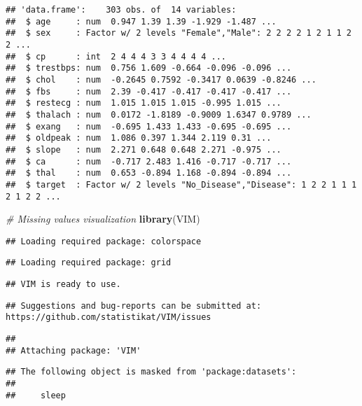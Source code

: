 \documentclass[
]{article}
\newenvironment{Shaded}{\begin{snugshade}}{\end{snugshade}}
\newcommand{\CommentTok}[1]{\textcolor[rgb]{0.56,0.35,0.01}{\textit{#1}}}
\newcommand{\FunctionTok}[1]{\textcolor[rgb]{0.13,0.29,0.53}{\textbf{#1}}}
\newcommand{\NormalTok}[1]{#1}
\begin{document}
\begin{verbatim}
## 'data.frame':    303 obs. of  14 variables:
##  $ age     : num  0.947 1.39 1.39 -1.929 -1.487 ...
##  $ sex     : Factor w/ 2 levels "Female","Male": 2 2 2 2 1 2 1 1 2 2 ...
##  $ cp      : int  2 4 4 4 3 3 4 4 4 4 ...
##  $ trestbps: num  0.756 1.609 -0.664 -0.096 -0.096 ...
##  $ chol    : num  -0.2645 0.7592 -0.3417 0.0639 -0.8246 ...
##  $ fbs     : num  2.39 -0.417 -0.417 -0.417 -0.417 ...
##  $ restecg : num  1.015 1.015 1.015 -0.995 1.015 ...
##  $ thalach : num  0.0172 -1.8189 -0.9009 1.6347 0.9789 ...
##  $ exang   : num  -0.695 1.433 1.433 -0.695 -0.695 ...
##  $ oldpeak : num  1.086 0.397 1.344 2.119 0.31 ...
##  $ slope   : num  2.271 0.648 0.648 2.271 -0.975 ...
##  $ ca      : num  -0.717 2.483 1.416 -0.717 -0.717 ...
##  $ thal    : num  0.653 -0.894 1.168 -0.894 -0.894 ...
##  $ target  : Factor w/ 2 levels "No_Disease","Disease": 1 2 2 1 1 1 2 1 2 2 ...
\end{verbatim}

\begin{Shaded}
\begin{Highlighting}[]
\CommentTok{\# Missing values visualization}
\FunctionTok{library}\NormalTok{(VIM)}
\end{Highlighting}
\end{Shaded}

\begin{verbatim}
## Loading required package: colorspace
\end{verbatim}

\begin{verbatim}
## Loading required package: grid
\end{verbatim}

\begin{verbatim}
## VIM is ready to use.
\end{verbatim}

\begin{verbatim}
## Suggestions and bug-reports can be submitted at: https://github.com/statistikat/VIM/issues
\end{verbatim}

\begin{verbatim}
## 
## Attaching package: 'VIM'
\end{verbatim}

\begin{verbatim}
## The following object is masked from 'package:datasets':
## 
##     sleep
\end{verbatim}
\end{document}
